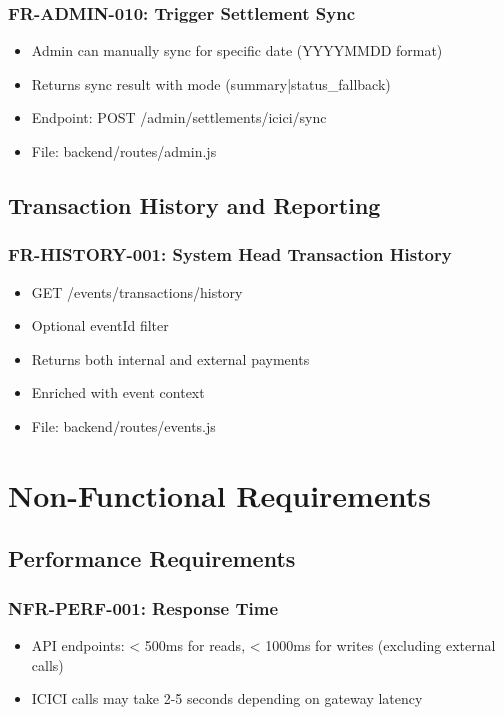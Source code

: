 \documentclass[12pt,a4paper]{article}
\begin{document}
\subsubsection{FR-ADMIN-010: Trigger Settlement Sync}
\begin{itemize}
  \item Admin can manually sync for specific date (YYYYMMDD format)
  \item Returns sync result with mode (summary|status\_fallback)
  \item Endpoint: POST /admin/settlements/icici/sync
  \item File: backend/routes/admin.js
\end{itemize}

\subsection{Transaction History and Reporting}

\subsubsection{FR-HISTORY-001: System Head Transaction History}
\begin{itemize}
  \item GET /events/transactions/history
  \item Optional eventId filter
  \item Returns both internal and external payments
  \item Enriched with event context
  \item File: backend/routes/events.js
\end{itemize}

\section{Non-Functional Requirements}

\subsection{Performance Requirements}

\subsubsection{NFR-PERF-001: Response Time}
\begin{itemize}
  \item API endpoints: < 500ms for reads, < 1000ms for writes (excluding external calls)
  \item ICICI calls may take 2-5 seconds depending on gateway latency
\end{itemize}
\end{document}
